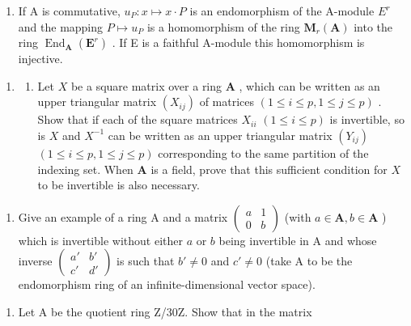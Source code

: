 \begin{enumerate}
\def\labelenumi{(\alph{enumi})}
\setcounter{enumi}{2}
\tightlist
\item
  If A is commutative, \(u_{P}: x \mapsto x \cdot P\) is an endomorphism of the A-module \(E^{r}\) and the mapping \(P \mapsto u_{P}\) is a homomorphism of the ring \(\mathbf{M}_{r}(\mathbf{A})\) into the ring \(\operatorname{End}_{\mathbf{A}}(\mathbf{E}^{r})\) . If E is a faithful A-module this homomorphism is injective.
\end{enumerate}

\begin{enumerate}
\def\labelenumi{\arabic{enumi}.}
\setcounter{enumi}{1}
\tightlist
\item
  \begin{enumerate}
  \def\labelenumii{(\alph{enumii})}
  \tightlist
  \item
    Let \(X\) be a square matrix over a ring \(\mathbf{A}\) , which can be written as an upper triangular matrix \((X_{ij})\) of matrices \((1 \leqslant i \leqslant p, 1 \leqslant j \leqslant p)\) . Show that if each of the square matrices \(X_{ii}\) \((1 \leqslant i \leqslant p)\) is invertible, so is \(X\) and \(X^{-1}\) can be written as an upper triangular matrix \((Y_{ij})\) \((1 \leqslant i \leqslant p, 1 \leqslant j \leqslant p)\) corresponding to the same partition of the indexing set. When \(\mathbf{A}\) is a field, prove that this sufficient condition for \(X\) to be invertible is also necessary.
  \end{enumerate}
\end{enumerate}

\begin{enumerate}
\def\labelenumi{(\alph{enumi})}
\setcounter{enumi}{1}
\tightlist
\item
  Give an example of a ring A and a matrix \(\begin{pmatrix} a & 1 \\ 0 & b \end{pmatrix}\) (with \(a \in \mathbf{A}, b \in \mathbf{A}\) ) which is invertible without either \(a\) or \(b\) being invertible in A and whose inverse \(\begin{pmatrix} a' & b' \\ c' & d' \end{pmatrix}\) is such that \(b' \neq 0\) and \(c' \neq 0\) (take A to be the endomorphism ring of an infinite-dimensional vector space).
\end{enumerate}

\begin{enumerate}
\def\labelenumi{\arabic{enumi}.}
\setcounter{enumi}{2}
\tightlist
\item
  Let A be the quotient ring Z/30Z. Show that in the matrix
\end{enumerate}

